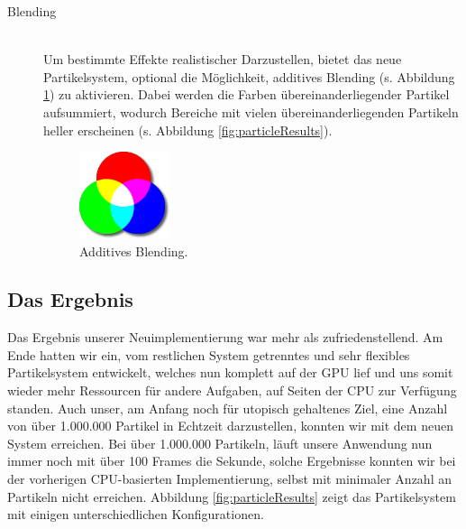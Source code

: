 \begin{Spacing}{\mylinespace}
\begin{description}
	\item[Blending] \hfill \\
Um bestimmte Effekte realistischer Darzustellen, bietet das neue Partikelsystem, optional die Möglichkeit, additives Blending (s. Abbildung \ref{fig:addBlending}) zu aktivieren. Dabei werden die Farben übereinanderliegender Partikel aufsummiert, wodurch Bereiche mit vielen übereinanderliegenden Partikeln heller erscheinen (s. Abbildung \ref{fig:particleResults}).

\begin{figure}[h!]
	\centering
	\vspace*{10px}
	\includegraphics[width=100px]{graphics/additiveBlending.png}
	\caption{Additives Blending.}
	\label{fig:addBlending}
\end{figure}

\end{description}

\newpage
\subsection{Das Ergebnis}

Das Ergebnis unserer Neuimplementierung war mehr als zufriedenstellend. Am Ende hatten wir ein, vom restlichen System getrenntes und sehr flexibles Partikelsystem entwickelt, welches nun komplett auf der GPU lief und uns somit wieder mehr Ressourcen für andere Aufgaben, auf Seiten der CPU zur Verfügung standen. Auch unser, am Anfang noch für utopisch gehaltenes Ziel, eine Anzahl von über 1.000.000 Partikel in Echtzeit darzustellen, konnten wir mit dem neuen System erreichen. Bei über 1.000.000 Partikeln, läuft unsere Anwendung nun immer noch mit über 100 Frames die Sekunde, solche Ergebnisse konnten wir bei der vorherigen CPU-basierten Implementierung, selbst mit minimaler Anzahl an Partikeln nicht erreichen. Abbildung \ref{fig:particleResults} zeigt das Partikelsystem mit einigen unterschiedlichen Konfigurationen.


\end{Spacing}
